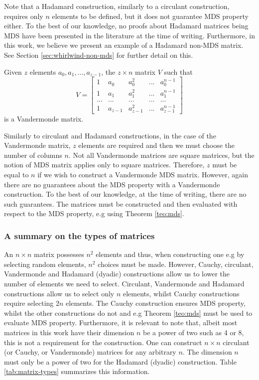Note that a Hadamard construction, similarly to a circulant construction, requires only $n$ elements to be defined, but it does not guarantee MDS property either. To the best of our knowledge, no proofs about Hadamard matrices being MDS have been presented in the literature at the time of writing. Furthermore, in this work, we believe we present an example of a Hadamard non-MDS matrix. See Section \ref{sec:whirlwind-non-mds} for further detail on this.

\begin{definition}
Given $z$ elements $a_0, a_1, ..., a_{z-1}$, the $z \times n$ matrix $V$ such that
\begin{equation}\label{eq:cost}
V =
\begin{bmatrix}
1 & a_0 & a_0^2 & ... & a_0^{n-1}\\
1 & a_1 & a_1^2 & ... & a_1^{n-1}\\
... & ... & ... & ... & ...\\
1 & a_{z-1} & a_{z-1}^2 & ... & a_{z-1}^{n-1}
\end{bmatrix}
\end{equation}
is a Vandermonde matrix.
\end{definition}

Similarly to circulant and Hadamard constructions, in the case of the Vandermonde matrix, $z$ elements are required and then we must choose the number of columns $n$. Not all Vandermonde matrices are square matrices, but the notion of MDS matrix applies only to square matrices. Therefore, $z$ must be equal to $n$ if we wish to construct a Vandermonde MDS matrix. However, again there are no guarantees about the MDS property with a Vandermonde construction. To the best of our knowledge, at the time of writing, there are no such guarantees. The matrices must be constructed and then evaluated with respect to the MDS property, e.g using Theorem \ref{teo:mds}.

\subsubsection{A summary on the types of matrices}
An $n\times n$ matrix possesses $n^2$ elements and thus, when constructing one e.g by selecting random elements, $n^2$ choices must be made. However, Cauchy, circulant, Vandermonde and Hadamard (dyadic) constructions allow us to lower the number of elements we need to select. Circulant, Vandermonde and Hadamard constructions allow us to select only $n$ elements, whilst Cauchy constructions require selecting $2n$ elements. The Cauchy construction ensures MDS property, whilst the other constructions do not and e.g Theorem \ref{teo:mds} must be used to evaluate MDS property. Furthermore, it is relevant to note that, albeit most matrices in this work have their dimension $n$ be a power of two such as 4 or 8, this is not a requirement for the construction. One can construct $n \times n$ circulant (or Cauchy, or Vandermonde) matrices for any arbitrary $n$. The dimension $n$ must only be a power of two for the Hadamard (dyadic) construction. Table \ref{tab:matrix-types} summarizes this information.

